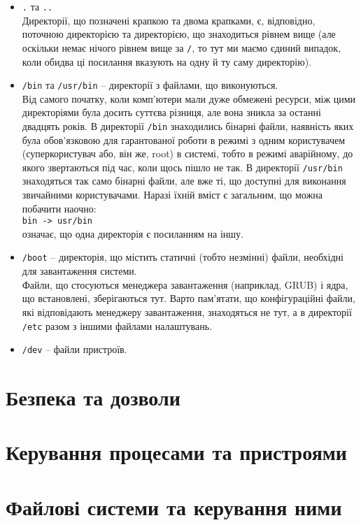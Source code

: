 \documentclass[10pt,a4paper]{fancyhandout}
\begin{document}
\begin{itemize}
	\item \texttt{.} та \texttt{..} \\ Директорії, що позначені крапкою та двома крапками, є, відповідно, поточною директорією та директорією, що знаходиться рівнем вище (але оскільки немає нічого рівнем вище за \texttt{/}, то тут ми маємо єдиний випадок, коли обидва ці посилання вказують на одну й ту саму директорію).
	\item \texttt{/bin} та \texttt{/usr/bin} -- директорії з файлами, що виконуються.\\ Від самого початку, коли комп'ютери мали дуже обмежені ресурси, між цими директоріями була досить суттєва різниця, але вона зникла за останні двадцять років. В директорії \texttt{/bin} знаходились бінарні файли, наявність яких була обов'язковою для гарантованої роботи в режимі з одним користувачем (суперкористувач або, він же, root) в системі, тобто в режимі аварійному, до якого звертаються під час, коли щось пішло не так. В директорії \texttt{/usr/bin} знаходяться так само бінарні файли, але вже ті, що доступні для виконання звичайними користувачами. Наразі їхній вміст є загальним, що можна побачити наочно:\\
	\texttt{bin -> usr/bin}\\ означає, що одна директорія є посиланням на іншу.
	\item \texttt{/boot} -- директорія, що містить статичні (тобто незмінні) файли, необхідні для завантаження системи. \\ Файли, що стосуються менеджера завантаження (наприклад, GRUB) і ядра, що встановлені, зберігаються тут. Варто пам'ятати, що конфігураційні файли, які відповідають менеджеру завантаження, знаходяться не тут, а в директорії \texttt{/etc} разом з іншими файлами налаштувань.
	\item \texttt{/dev} -- файли пристроїв. \\
	
	
\end{itemize}

\section{Безпека та дозволи} \label{Безпека та дозволи}
\section{Керування процесами та пристроями}
\section{Файлові системи та керування ними}
\tableofcontents
\doclicenseThis
\end{document}

